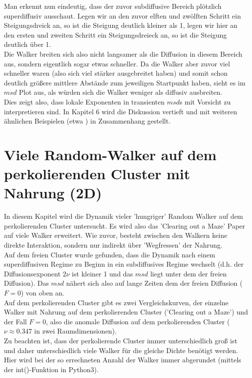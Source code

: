 \documentclass[a4paper, 12pt]{report}
\begin{document}
\noindent Man erkennt nun eindeutig, dass der zuvor subdiffusive Bereich plötzlich superdiffusiv ausschaut. Legen wir an den zuvor elften und zwölften Schritt ein Steigungsdreick an, so ist die Steigung deutlich kleiner als 1, legen wir hier an den ersten und zweiten Schritt ein Steigungsdreieck an, so ist die Steigung deutlich über 1.
\\
Die Walker breiten sich also nicht langsamer als die Diffusion in diesem Bereich aus, sondern eigentlich sogar etwas schneller. Da die Walker aber zuvor viel schneller waren (also sich viel stärker ausgebreitet haben) und somit schon deutlich größere mittlere Abstände zum jeweiligen Startpunkt haben, sieht es im $msd$ Plot aus, als würden sich die Walker weniger als diffusiv ausbreiten.
\\
Dies zeigt also, dass lokale Exponenten in transienten $msd$s mit Vorsicht zu interpretieren sind. In Kapitel 6 wird die Diskussion vertieft und mit weiteren ähnlichen Beispielen (etwa \cite{Zausch_2008}) in Zusammenhang gestellt.

\chapter{Viele Random-Walker auf dem perkolierenden Cluster mit Nahrung (2D)}
In diesem Kapitel wird die Dynamik vieler 'hungriger' Random Walker auf dem perkolierenden Cluster untersucht. Es wird also das 'Clearing out a Maze' Paper auf viele Walker erweitert. Wie zuvor, besteht zwischen den Walkern keine direkte Interaktion, sondern nur indirekt über 'Wegfressen' der Nahrung.
\\
\noindent Auf dem freien Cluster wurde gefunden, dass die Dynamik nach einem superdiffusiven Regime zu Beginn in ein subdiffusives Regime wechselt (d.h. der Diffusionsexponent $2\nu$ ist kleiner 1 und das $msd$ liegt unter dem der freien Diffusion). Das $msd$ nähert sich also auf lange Zeiten dem der freien Diffusion ($F=0$) von oben an.
\\
\noindent Auf dem perkolierenden Cluster gibt es zwei Vergleichskurven, der einzelne Walker mit Nahrung auf dem perkolierenden Cluster ('Clearing out a Maze') und der Fall $F=0$, also die anomale Diffusion auf dem perkolierenden Cluster ($\nu \approx 0.347$ in zwei Raumdimensionen).
\\
\noindent Zu beachten ist, dass der perkolierende Cluster immer unterschiedlich groß ist und daher unterschiedlich viele Walker für die gleiche Dichte benötigt werden. Hier wird bei der so errechneten Anzahl der Walker immer abgerundet (mittels der int()-Funktion in Python3).
\end{document}

